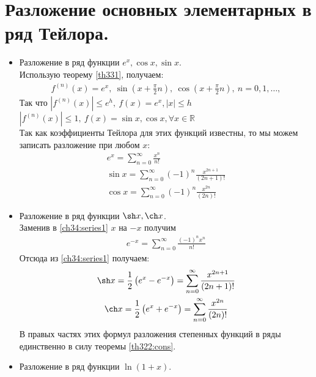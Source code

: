 \section{Разложение основных элементарных в ряд Тейлора.}
\begin{itemize}
  \item Разложение в ряд функции $e^x, \cos x, \sin x$. \\
    Использую теорему \eqref{th331}, получаем:
    \begin{gather*}
      f^{(n)}(x) = e^x, \ \sin(x + \frac{\pi}{2}n), \ \cos(x + \frac{\pi}{2}n),
      \ n = 0, 1, \dots,
    \end{gather*}
    Так что $|f^{(n)}(x)| \leq e^h, \ f(x) = e^x, |x| \leq h$ \\
    $|f^{(n)}(x)| \leq 1, \ f(x) = \sin x, \cos x, \forall x \in \mathbb{R}$ \\
    Так как коэффициенты Тейлора для этих функций известны, то мы можем
    записать разложение при любом $x$:
    \begin{gather}
      e^x = \sum\limits_{n = 0}^{\infty} \frac{x^n}{n!} \label{ch34:series1} \\
      \sin x = \sum\limits_{n = 0}^{\infty} (-1)^n \frac{x^{2n+1}}{(2n+1)!}
      \label{ch34:series2} \\
      \cos x = \sum\limits_{n = 0}^{\infty} (-1)^n \frac{x^{2n}}{(2n)!}
      \label{ch34:series3}
    \end{gather}
  \item Разложение в ряд функции $\sh x, \ch x$. \\
    Заменив в \eqref{ch34:series1} $x$ на $-x$ получим
    \begin{gather}
      e^{-x} = \sum\limits_{n = 0}^{\infty} \frac{(-1)^n x^n}{n!}
      \label{ch34:series4}
    \end{gather}
    Отсюда из \eqref{ch34:series1} получаем:
    \begin{gather}
      \sh x = \frac{1}{2} \left(e^x - e^{-x}\right) = \sum\limits_{n =
      0}^{\infty} \frac{x^{2n+1}}{(2n + 1)!} \label{ch34:series5} \\
      \ch x = \frac{1}{2} \left(e^x + e^{-x}\right) = \sum\limits_{n =
      0}^{\infty} \frac{x^{2n}}{(2n)!} \label{ch34:series6}
    \end{gather}
    В правых частях этих формул разложения степенных функций в ряды единственно
    в силу теоремы \eqref{th322:cons}.
  \item Разложение в ряд функции $\ln(1 + x)$. \\

\end{itemize}
